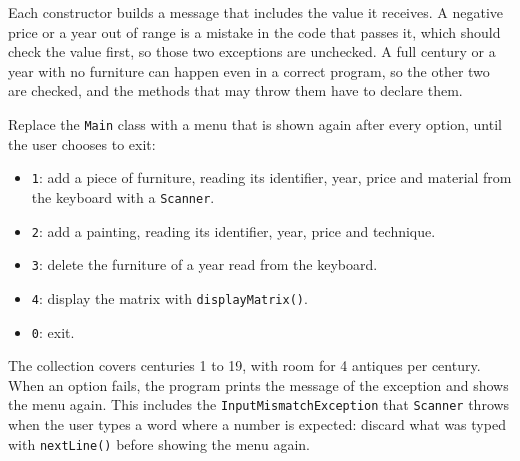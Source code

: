 \begin{itemize}
\begin{itemize}
        \end{itemize}

        Each constructor builds a message that includes the value it receives. A negative price or a year out of range is a mistake in the code that passes it, which should check the value first, so those two exceptions are unchecked. A full century or a year with no furniture can happen even in a correct program, so the other two are checked, and the methods that may throw them have to declare them.

\end{itemize}

Replace the \texttt{Main} class with a menu that is shown again after every option, until the user chooses to exit:

\begin{itemize}

    \item \texttt{1}: add a piece of furniture, reading its identifier, year, price and material from the keyboard with a \texttt{Scanner}.

    \item \texttt{2}: add a painting, reading its identifier, year, price and technique.

    \item \texttt{3}: delete the furniture of a year read from the keyboard.

    \item \texttt{4}: display the matrix with \texttt{displayMatrix()}.

    \item \texttt{0}: exit.

\end{itemize}

The collection covers centuries 1 to 19, with room for 4 antiques per century. When an option fails, the program prints the message of the exception and shows the menu again. This includes the \texttt{InputMismatchException} that \texttt{Scanner} throws when the user types a word where a number is expected: discard what was typed with \texttt{nextLine()} before showing the menu again.
